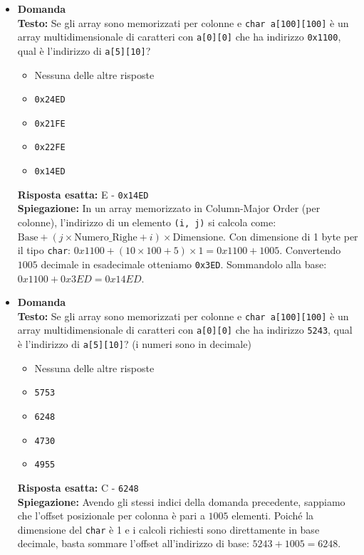 \documentclass[12pt, a4paper]{article}
\newcounter{domandateoria}
\begin{document}
\newpage

\begin{itemize}
    \item {}\textbf{Domanda \thedomandateoria} \\
    \textbf{Testo:} Se gli array sono memorizzati per colonne e \texttt{char a[100][100]} è un array multidimensionale di caratteri con \texttt{a[0][0]} che ha indirizzo \texttt{0x1100}, qual è l'indirizzo di \texttt{a[5][10]}?
    \begin{itemize}
        \item[A)] Nessuna delle altre risposte
        \item[B)] \texttt{0x24ED}
        \item[C)] \texttt{0x21FE}
        \item[D)] \texttt{0x22FE}
        \item[E)] \texttt{0x14ED}
    \end{itemize}
    \textbf{Risposta esatta:} E - \texttt{0x14ED} \\
    \textbf{Spiegazione:} In un array memorizzato in Column-Major Order (per colonne), l'indirizzo di un elemento \texttt{(i, j)} si calcola come: $\text{Base} + (j \times \text{Numero\_Righe} + i) \times \text{Dimensione}$.
    Con dimensione di 1 byte per il tipo \texttt{char}: $0x1100 + (10 \times 100 + 5) \times 1 = 0x1100 + 1005$. 
    Convertendo $1005$ decimale in esadecimale otteniamo \texttt{0x3ED}. Sommandolo alla base: $0x1100 + 0x3ED = 0x14ED$.
    \vspace{0.3cm}

    \item {}\textbf{Domanda \thedomandateoria} \\
    \textbf{Testo:} Se gli array sono memorizzati per colonne e \texttt{char a[100][100]} è un array multidimensionale di caratteri con \texttt{a[0][0]} che ha indirizzo \texttt{5243}, qual è l'indirizzo di \texttt{a[5][10]}? (i numeri sono in decimale)
    \begin{itemize}
        \item[A)] Nessuna delle altre risposte
        \item[B)] \texttt{5753}
        \item[C)] \texttt{6248}
        \item[D)] \texttt{4730}
        \item[E)] \texttt{4955}
    \end{itemize}
    \textbf{Risposta esatta:} C - \texttt{6248} \\
    \textbf{Spiegazione:} Avendo gli stessi indici della domanda precedente, sappiamo che l'offset posizionale per colonna è pari a $1005$ elementi. Poiché la dimensione del \texttt{char} è 1 e i calcoli richiesti sono direttamente in base decimale, basta sommare l'offset all'indirizzo di base: $5243 + 1005 = 6248$.
    \vspace{0.3cm}


\end{itemize}
\end{document}
